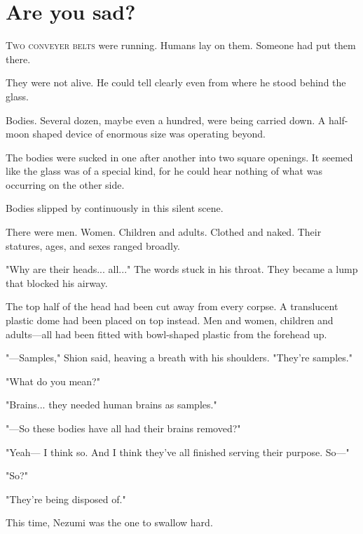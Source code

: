 
\chapter{Are you sad?}


\lettrine{T}{wo conveyer belts} were running. Humans lay on them. Someone had put
them there.

They were not alive. He could tell clearly even from where he stood
behind the glass.

Bodies. Several dozen, maybe even a hundred, were being carried down. A
half-moon shaped device of enormous size was operating beyond.

The bodies were sucked in one after another into two square openings. It
seemed like the glass was of a special kind, for he could hear nothing
of what was occurring on the other side.

Bodies slipped by continuously in this silent scene.

There were men. Women. Children and adults. Clothed and naked. Their
statures, ages, and sexes ranged broadly.

"Why are their heads... all..." The words stuck in his throat. They
became a lump that blocked his airway.

The top half of the head had been cut away from every corpse. A
translucent plastic dome had been placed on top instead. Men and women,
children and adults---all had been fitted with bowl-shaped plastic from
the forehead up.

"---Samples," Shion said, heaving a breath with his shoulders. "They're
samples."

"What do you mean?"

"Brains... they needed human brains as samples."

"---So these bodies have all had their brains removed?"

"Yeah--- I think so. And I think they've all finished serving their
purpose. So---"

"So?"

"They're being disposed of."

This time, Nezumi was the one to swallow hard.

